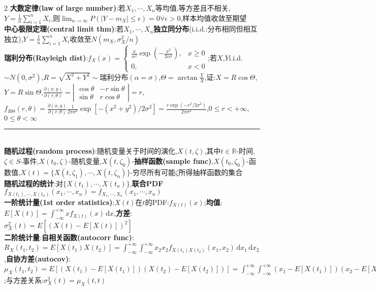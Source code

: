 \documentclass[UTF8,a4paper,10pt]{article}
\providecommand{\abs}[1]{\left\lvert#1\right\rvert}
\begin{document}
\begin{multicols}{2}
    \textbf{大数定律(law of large number)}:若$X_1,\cdots,X_n$等均值,等方差且不相关,$Y=\frac{1}{n}\sum_{i=1}^nX_i$,则$\lim_{n\rightarrow\infty}P(\abs{Y-m_X}\leq\epsilon)=0\forall\epsilon>0$,样本均值收敛至期望\\
    \textbf{中心极限定理(central limit thm)}:若$X_1,\cdots,X_n$\textbf{独立同分布}(i.i.d.:分布相同但相互独立),$Y=\frac{1}{n}\sum_{i=1}^nX_i$收敛至$N(m_X,\sigma_X^2/n)$\\
    \textbf{瑞利分布(Rayleigh dist)}:$f_X(x)=\left\{\begin{array}{ll}
        \frac{x}{\alpha^2}\exp(-\frac{x^2}{2\alpha^2}),&x\geq 0\\
        0,&x<0
    \end{array}\right.$;若$X$,$Y$i.i.d.$\sim N(0,\sigma^2)$,$R=\sqrt{X^2+Y^2}\sim$瑞利分布$(\alpha=\sigma)$,$\Theta=\arctan\frac{Y}{X}$,证:$X=R\cos\Theta$,$Y=R\sin\Theta$,$\frac{\partial(x,y)}{\partial(r,\theta)}=\left\lvert\begin{smallmatrix}
        \cos\theta&-r\sin\theta\\
        \sin\theta&r\cos\theta
    \end{smallmatrix}\right\rvert=r$,$f_{R\Theta}(r,\theta)=\frac{\partial(x,y)}{\partial(r,\theta)}\frac{1}{2\pi\sigma^2}\exp[-(x^2+y^2)/2\sigma^2]=\frac{r\exp(-r^2/2\sigma^2)}{2\pi\sigma^2}$,$0\leq r<+\infty$,$0\leq\theta<\infty$\\
    \rule{\columnwidth}{.5pt}\\
    \textbf{随机过程(random process)}:随机变量关于时间的演化,$X(t,\zeta)$,其中$t\in\mathbb{R}$-时间,$\zeta\in S$-事件,$X(t_0,\zeta)$-随机变量,$X(t,\zeta_0)$-\textbf{抽样函数(sample func)},$X(t_0,\zeta_0)$-函数值,$X(t)=\{X(t,\zeta_1),\cdots,X(t,\zeta_n)\}$-穷尽所有可能$\zeta$所得抽样函数的集合\\
    \textbf{随机过程的统计}:对$\{X(t_1),\cdots,X(t_n)\}$,\textbf{联合PDF}$f_{X(t_1),\cdots,X(t_n)}(x_1,\cdots,x_n)=f_{X_1,\cdots,X_n}(x_1,\cdots,x_n)$\\
    \textbf{一阶统计量(1st order statistics)}:$X(t)$在$t$的PDF:$f_{X(t)}(x)$;\textbf{均值}:$E[X(t)]=\int_{-\infty}^{+\infty}xf_{X(t)}(x)\,\mathrm{d}x$,\textbf{方差}:$\sigma_X^2(t)=E[(X(t)-E[X(t)])^2]$\\
    \textbf{二阶统计量}:\textbf{自相关函数(autocorr func)}:$R_X(t_1,t_2)=E[X(t_1)X(t_2)]=\int_{-\infty}^{+\infty}\int_{-\infty}^{+\infty}x_2x_2f_{X(t_1)X(t_2)}(x_1,x_2)\,\mathrm{d}x_1\,\mathrm{d}x_2$,\textbf{自协方差(autocov)}:$\mu_X(t_1,t_2)=E[(X(t_1)-E[X(t_1)])(X(t_2)-E[X(t_2)])]=\int_{-\infty}^{+\infty}\int_{-\infty}^{+\infty}(x_1-E[X(t_1)])(x_2-E[X(t_2)])f_{X(t_1)X(t_2)}(x_1,x_2)\,\mathrm{d}x_1\,\mathrm{d}x_2=R_X(t_1,t_2)-E[X(t_1)]E[X(t_2)]$;与方差关系:$\sigma_X^2(t)=\mu_X(t,t)$\\

\end{multicols}
\end{document}
